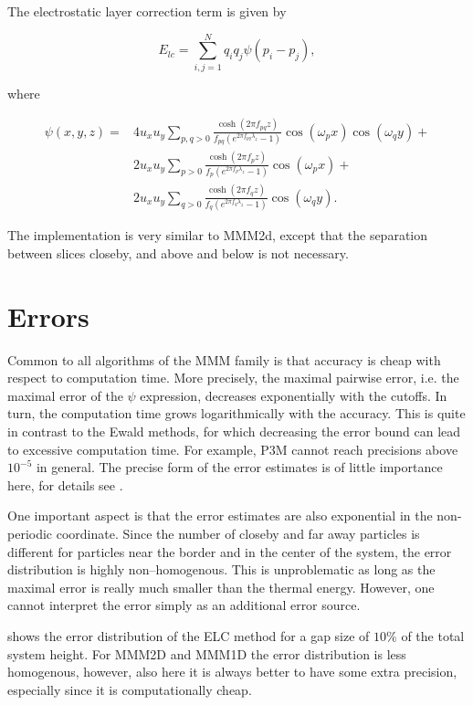 The electrostatic layer correction term is given by

\[ E_{lc}=\sum_{i,j=1}^Nq_iq_j\psi(p_i-p_j), \]

where

\[ \begin{array}{rl} \psi(x,y,z)=&4u_xu_y\sum_{p,q>0}\frac{\cosh(2\pi
    f_{pq}z)}{f_{pq}(e^{2\pi f_{pq}\lambda_z} - 1)} \cos(\omega_p
  x)\cos(\omega_q y) + \\ &2u_xu_y\sum_{p>0}\frac{\cosh(2\pi f_p
    z)}{f_p(e^{2\pi f_p\lambda_z} - 1)}\cos(\omega_p x)+\\
  &2u_xu_y\sum_{q>0}\frac{\cosh(2\pi f_q z)}{f_q(e^{2\pi f_q\lambda_z}
    - 1)}\cos(\omega_q y). \end{array} \]

The implementation is very similar to MMM2d, except that the
separation between slices closeby, and above and below is not
necessary.

\section{Errors}


Common to all algorithms of the MMM family is that accuracy is cheap
with respect to computation time. More precisely, the maximal pairwise
error, i.e. the maximal error of the $\psi$ expression, decreases
exponentially with the cutoffs. In turn, the computation time grows
logarithmically with the accuracy. This is quite in contrast to the
Ewald methods, for which decreasing the error bound can lead to
excessive computation time. For example, P3M cannot reach precisions
above $10^{-5}$ in general. The precise form of the error estimates is
of little importance here, for details see \citet{arnold02c,arnold02d}.

One important aspect is that the error estimates are also exponential
in the non-periodic coordinate. Since the number of closeby and far
away particles is different for particles near the border and in the
center of the system, the error distribution is highly
non--homogenous. This is unproblematic as long as the maximal error is
really much smaller than the thermal energy. However, one cannot
interpret the error simply as an additional error source.


shows the error distribution of the ELC method for a gap size of
$10\%$ of the total system height. For MMM2D and MMM1D the error
distribution is less homogenous, however, also here it is always
better to have some extra precision, especially since it is
computationally cheap.


